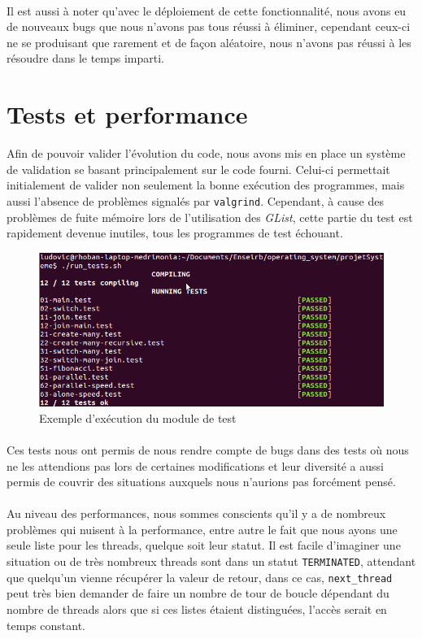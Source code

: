 \documentclass{article}
\begin{document}
        \paragraph{}
        Il est aussi à noter qu'avec le déploiement de cette fonctionnalité,
        nous avons eu de nouveaux bugs que nous n'avons pas tous réussi à
        éliminer, cependant ceux-ci ne se produisant que rarement et de façon
        aléatoire, nous n'avons pas réussi à les résoudre dans le temps
        imparti.

	\section{Tests et performance}
    Afin de pouvoir valider l'évolution du code, nous avons mis en place un
    système de validation se basant principalement sur le code fourni.
    Celui-ci permettait initialement de valider non seulement la bonne
    exécution des programmes, mais aussi l'absence de problèmes signalés par
    \verb!valgrind!. Cependant, à cause des problèmes de fuite mémoire lors
    de l'utilisation des {\em GList}, cette partie du test est rapidement
    devenue inutiles, tous les programmes de test échouant.
    \begin{figure}[H]
      \caption{Exemple d'exécution du module de test}
      \centering
      \includegraphics [width=\textwidth]{tests.png}
    \end{figure}
    \paragraph{}
    Ces tests nous ont permis de nous rendre compte de bugs dans des tests
    où nous ne les attendions pas lors de certaines modifications et leur
    diversité a aussi permis de couvrir des situations auxquels nous
    n'aurions pas forcément pensé.
    \paragraph{}
    Au niveau des performances, nous sommes conscients qu'il y a de
    nombreux problèmes qui nuisent à la performance, entre autre le fait que
    nous ayons une seule liste pour les threads, quelque soit leur statut. Il
    est facile d'imaginer une situation ou de très nombreux threads sont dans
    un statut \verb!TERMINATED!, attendant que quelqu'un vienne récupérer
    la valeur de retour, dans ce cas, \verb!next_thread! peut très bien
    demander de faire un nombre de tour de boucle dépendant du nombre de
    threads alors que si ces listes étaient distinguées, l'accès serait en
    temps constant.
\end{document}
